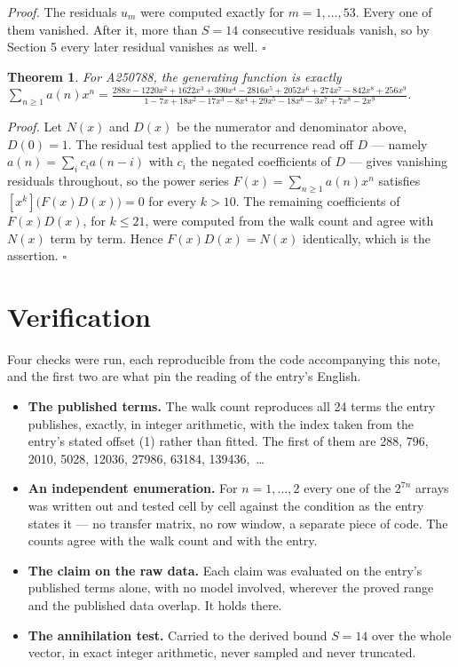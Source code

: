\documentclass[11pt]{article}
\newtheorem{theorem}{Theorem}
\theoremstyle{definition}
\begin{document}
{\itshape Proof.} The residuals $u_m$ were computed exactly for $m = 1,\dots,53$. Every one of them vanished. After it, more than $S = 14$ consecutive residuals vanish, so by Section 5 every later residual vanishes as well. $\square$

\begin{theorem} For A250788, the generating function is exactly $\sum_{n\ge 1} a(n)x^n = \frac{288x - 1220x^{2} + 1622x^{3} + 390x^{4} - 2816x^{5} + 2052x^{6} + 274x^{7} - 842x^{8} + 256x^{9}}{1 - 7x + 18x^{2} - 17x^{3} - 8x^{4} + 29x^{5} - 18x^{6} - 3x^{7} + 7x^{8} - 2x^{9}}$.\end{theorem}

{\itshape Proof.} Let $N(x)$ and $D(x)$ be the numerator and denominator above, $D(0)=1$. The residual test applied to the recurrence read off $D$ --- namely $a(n) = \sum_i c_i a(n-i)$ with $c_i$ the negated coefficients of $D$ --- gives vanishing residuals throughout, so the power series $F(x)=\sum_{n\ge 1}a(n)x^n$ satisfies $[x^k]\bigl(F(x)D(x)\bigr) = 0$ for every $k > 10$. The remaining coefficients of $F(x)D(x)$, for $k \le 21$, were computed from the walk count and agree with $N(x)$ term by term. Hence $F(x)D(x) = N(x)$ identically, which is the assertion. $\square$

\section{Verification}

Four checks were run, each reproducible from the code accompanying this note, and the first two are what pin the reading of the entry's English.

\begin{itemize}

\item {\bfseries The published terms.} The walk count reproduces all 24 terms the entry publishes, exactly, in integer arithmetic, with the index taken from the entry's stated offset (1) rather than fitted. The first of them are 288, 796, 2010, 5028, 12036, 27986, 63184, 139436,~\dots

\item {\bfseries An independent enumeration.} For $n = 1,\dots,2$ every one of the $2^{7n}$ arrays was written out and tested cell by cell against the condition as the entry states it --- no transfer matrix, no row window, a separate piece of code. The counts agree with the walk count and with the entry.

\item {\bfseries The claim on the raw data.} Each claim was evaluated on the entry's published terms alone, with no model involved, wherever the proved range and the published data overlap. It holds there.

\item {\bfseries The annihilation test.} Carried to the derived bound $S = 14$ over the whole vector, in exact integer arithmetic, never sampled and never truncated.

\end{itemize}
\end{document}

